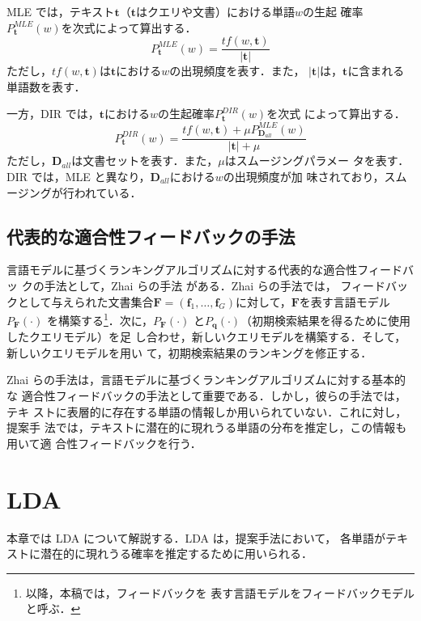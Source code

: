 \documentclass[japanese]{jnlp_1.4}
\begin{document}
MLE では，テキスト$\bm{t}$（$\bm{t}$はクエリや文書）における単語$w$の生起
確率$P^{MLE}_{\bm{t}}(w)$を次式によって算出する．
\begin{equation}
 P^{MLE}_{\bm{t}}(w)
 =
 \frac{tf(w,\bm{t})}{|\bm{t}|}
 \label{equ:mle}
\end{equation}
ただし，$tf(w,\bm{t})$は$\bm{t}$における$w$の出現頻度を表す．また，
$|\bm{t}|$は，$\bm{t}$に含まれる単語数を表す．

一方，DIR では，$\bm{t}$における$w$の生起確率$P^{DIR}_{\bm{t}}(w)$を次式
によって算出する．
\begin{equation}
 P^{DIR}_{\bm{t}}(w)
 =
 \frac
 {tf(w,\bm{t}) + \mu P^{MLE}_{\bm{D}_{all}}(w)}
 {|\bm{t}| + \mu}
 \label{equ:dir}
\end{equation}
ただし，$\bm{D}_{all}$は文書セットを表す．また，$\mu$はスムージングパラメー
タを表す．DIR では，MLE と異なり，$\bm{D}_{all}$における$w$の出現頻度が加
味されており，スムージングが行われている．



\subsection{代表的な適合性フィードバックの手法}

言語モデルに基づくランキングアルゴリズムに対する代表的な適合性フィードバッ
クの手法として，Zhai らの手法 \cite{Zhai2001} がある．Zhai らの手法では，
フィードバックとして与えられた文書集合$\bm{F} = (\bm{f}_{1}, \dots,
\bm{f}_{G})$に対して，$\bm{F}$を表す言語モデル
$P_{\bm{F}}(\cdot)$ を構築する\footnote{以降，本稿では，フィードバックを
表す言語モデルをフィードバックモデルと呼ぶ．}．次に，$P_{\bm{F}}(\cdot)$
と$P_{\bm{q}}(\cdot)$（初期検索結果を得るために使用したクエリモデル）を足
し合わせ，新しいクエリモデルを構築する．そして，新しいクエリモデルを用い
て，初期検索結果のランキングを修正する．

Zhai らの手法は，言語モデルに基づくランキングアルゴリズムに対する基本的な
適合性フィードバックの手法として重要である．しかし，彼らの手法では，テキ
ストに表層的に存在する単語の情報しか用いられていない．これに対し，提案手
法では，テキストに潜在的に現れうる単語の分布を推定し，この情報も用いて適
合性フィードバックを行う．


\section{LDA} \label{sec:lda}

本章では LDA \cite{Blei2003}について解説する．LDA は，提案手法において，
各単語がテキストに潜在的に現れうる確率を推定するために用いられる．
\end{document}
